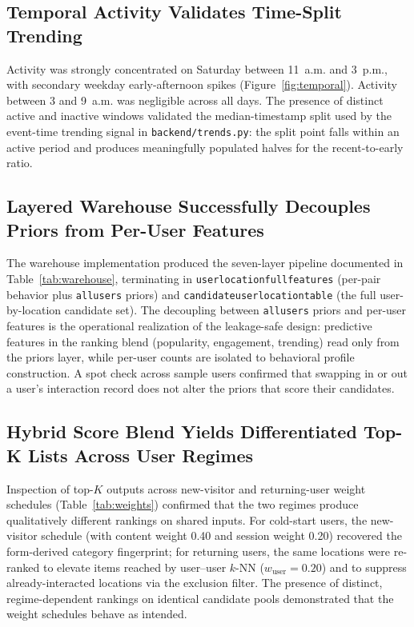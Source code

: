 \documentclass[12pt,letterpaper]{article}
\newcommand{\codeunderscore}{\discretionary{\textunderscore}{}{\textunderscore}}
\newcommand{\code}[1]{\begingroup\let\_\codeunderscore\texttt{\small #1}\endgroup}
\begin{document}
\subsection{Temporal Activity Validates Time-Split Trending}

Activity was strongly concentrated on Saturday between 11~a.m. and
3~p.m., with secondary weekday early-afternoon spikes
(Figure~\ref{fig:temporal}). Activity between 3 and 9~a.m. was
negligible across all days. The presence of distinct active and
inactive windows validated the median-timestamp split used by the
event-time trending signal in \code{backend/trends.py}: the split
point falls within an active period and produces meaningfully
populated halves for the recent-to-early ratio.

\subsection{Layered Warehouse Successfully Decouples Priors from Per-User Features}

The warehouse implementation produced the seven-layer pipeline
documented in Table~\ref{tab:warehouse}, terminating in
\code{user\_location\_full\_features} (per-pair behavior plus
\code{*\_all\_users} priors) and \code{candidate\_user\_location\_table}
(the full user-by-location candidate set). The decoupling between
\code{*\_all\_users} priors and per-user features is the operational
realization of the leakage-safe design: predictive features in the
ranking blend (popularity, engagement, trending) read only from the
priors layer, while per-user counts are isolated to behavioral profile
construction. A spot check across sample users confirmed that
swapping in or out a user's interaction record does not alter the
priors that score their candidates.

\subsection{Hybrid Score Blend Yields Differentiated Top-K Lists Across User Regimes}

Inspection of top-$K$ outputs across new-visitor and returning-user
weight schedules (Table~\ref{tab:weights}) confirmed that the two
regimes produce qualitatively different rankings on shared inputs.
For cold-start users, the new-visitor schedule (with content weight
0.40 and session weight 0.20) recovered the form-derived category
fingerprint; for returning users, the same locations were re-ranked
to elevate items reached by user--user $k$-NN ($w_\text{user} = 0.20$)
and to suppress already-interacted locations via the
exclusion filter. The presence of distinct, regime-dependent rankings
on identical candidate pools demonstrated that the weight schedules
behave as intended.
\end{document}

